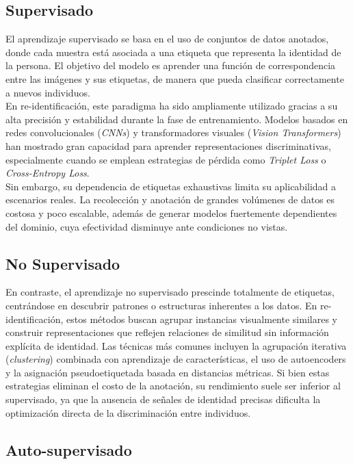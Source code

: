 \subsection{Supervisado}

El aprendizaje supervisado se basa en el uso de conjuntos de datos anotados, donde cada muestra está asociada a una etiqueta que representa la identidad de la persona. El objetivo del modelo es aprender una función de correspondencia entre las imágenes y sus etiquetas, de manera que pueda clasificar correctamente a nuevos individuos. \\
En re-identificación, este paradigma ha sido ampliamente utilizado gracias a su alta precisión y estabilidad durante la fase de entrenamiento. Modelos basados en redes convolucionales (\textit{CNNs}) y transformadores visuales (\textit{Vision Transformers}) han mostrado gran capacidad para aprender representaciones discriminativas, especialmente cuando se emplean estrategias de pérdida como \textit{Triplet Loss} o \textit{Cross-Entropy Loss}. \\
Sin embargo, su dependencia de etiquetas exhaustivas limita su aplicabilidad a escenarios reales. La recolección y anotación de grandes volúmenes de datos es costosa y poco escalable, además de generar modelos fuertemente dependientes del dominio, cuya efectividad disminuye ante condiciones no vistas.

\subsection{No Supervisado}

En contraste, el aprendizaje no supervisado prescinde totalmente de etiquetas, centrándose en descubrir patrones o estructuras inherentes a los datos. En re-identificación, estos métodos buscan agrupar instancias visualmente similares y construir representaciones que reflejen relaciones de similitud sin información explícita de identidad. Las técnicas más comunes incluyen la agrupación iterativa (\textit{clustering}) combinada con aprendizaje de características, el uso de autoencoders y la asignación pseudoetiquetada basada en distancias métricas. Si bien estas estrategias eliminan el costo de la anotación, su rendimiento suele ser inferior al supervisado, ya que la ausencia de señales de identidad precisas dificulta la optimización directa de la discriminación entre individuos.

\subsection{Auto-supervisado}

